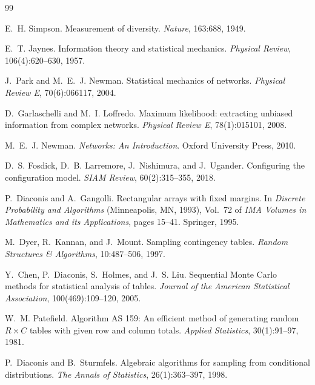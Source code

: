 \documentclass[11pt]{article}
\newcommand{\1}{\mathbf{1}}
\theoremstyle{plain}
\theoremstyle{definition}
\begin{document}
\begin{thebibliography}{99}

E.~H. Simpson.
\newblock Measurement of diversity.
\newblock \emph{Nature}, 163:688, 1949.

E.~T. Jaynes.
\newblock Information theory and statistical mechanics.
\newblock \emph{Physical Review}, 106(4):620--630, 1957.

J.~Park and M.~E.~J. Newman.
\newblock Statistical mechanics of networks.
\newblock \emph{Physical Review E}, 70(6):066117, 2004.

D.~Garlaschelli and M.~I. Loffredo.
\newblock Maximum likelihood: extracting unbiased information from complex networks.
\newblock \emph{Physical Review E}, 78(1):015101, 2008.

M.~E.~J. Newman.
\newblock \emph{Networks: An Introduction}.
\newblock Oxford University Press, 2010.

D.~S. Fosdick, D.~B. Larremore, J.~Nishimura, and J.~Ugander.
\newblock Configuring the configuration model.
\newblock \emph{SIAM Review}, 60(2):315--355, 2018.

P.~Diaconis and A.~Gangolli.
\newblock Rectangular arrays with fixed margins.
\newblock In \emph{Discrete Probability and Algorithms} (Minneapolis, MN, 1993),
  Vol.~72 of \emph{IMA Volumes in Mathematics and its Applications},
  pages 15--41. Springer, 1995.

M.~Dyer, R.~Kannan, and J.~Mount.
\newblock Sampling contingency tables.
\newblock \emph{Random Structures \& Algorithms}, 10:487--506, 1997.

Y.~Chen, P.~Diaconis, S.~Holmes, and J.~S. Liu.
\newblock Sequential {M}onte {C}arlo methods for statistical analysis of tables.
\newblock \emph{Journal of the American Statistical Association},
  100(469):109--120, 2005.

W.~M. Patefield.
\newblock Algorithm {AS} 159: An efficient method of generating random $R \times C$
  tables with given row and column totals.
\newblock \emph{Applied Statistics}, 30(1):91--97, 1981.

P.~Diaconis and B.~Sturmfels.
\newblock Algebraic algorithms for sampling from conditional distributions.
\newblock \emph{The Annals of Statistics}, 26(1):363--397, 1998.


\end{thebibliography}
\end{document}
